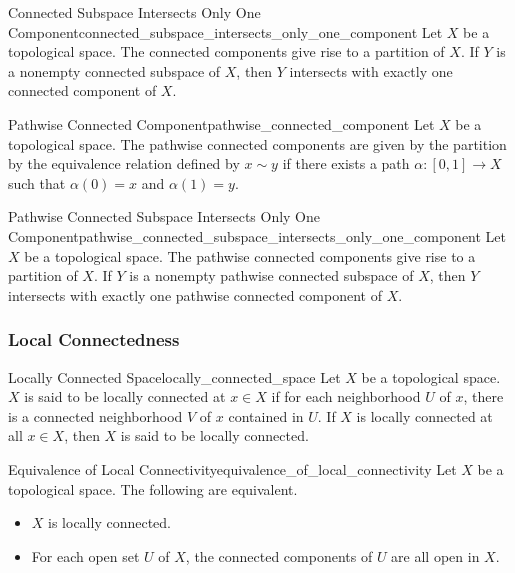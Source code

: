\documentclass{article}
\begin{document}
\begin{theorem}{Connected Subspace Intersects Only One Component}{connected_subspace_intersects_only_one_component}
    Let $X$ be a topological space.
    The connected components give rise to a partition of $X$.
    If $Y$ is a nonempty connected subspace of $X$, then $Y$ intersects with exactly one connected component of $X$.
\end{theorem}

\begin{definition}{Pathwise Connected Component}{pathwise_connected_component}
    Let $X$ be a topological space.
    The pathwise connected components are given by the partition by the equivalence relation defined by $x\sim y$ if there exists a path $\alpha:[0,1]\rightarrow X$ such that $\alpha(0) = x$ and $\alpha(1) = y$.
\end{definition}

\begin{theorem}{Pathwise Connected Subspace Intersects Only One Component}{pathwise_connected_subspace_intersects_only_one_component}
    Let $X$ be a topological space.
    The pathwise connected components give rise to a partition of $X$.
    If $Y$ is a nonempty pathwise connected subspace of $X$, then $Y$ intersects with exactly one pathwise connected component of $X$.
\end{theorem}

\subsubsection{Local Connectedness}

\begin{definition}{Locally Connected Space}{locally_connected_space}
    Let $X$ be a topological space.
    $X$ is said to be locally connected at $x\in X$ if for each neighborhood $U$ of $x$, there is a connected neighborhood $V$ of $x$ contained in $U$.
    If $X$ is locally connected at all $x\in X$, then $X$ is said to be locally connected.
\end{definition}

\begin{theorem}{Equivalence of Local Connectivity}{equivalence_of_local_connectivity}
    Let $X$ be a topological space.
    The following are equivalent.
    \begin{itemize}
        \item $X$ is locally connected.
        \item For each open set $U$ of $X$, the connected components of $U$ are all open in $X$.
    \end{itemize}
\end{theorem}
\end{document}
